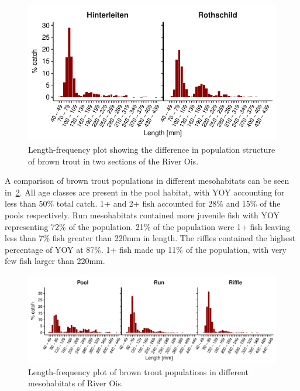 \begin{figure}[!htb]                              %
	\center
	\includegraphics{images/brown_section.pdf}                %
	\caption{Length-frequency plot showing the difference in population structure of brown trout in two sections of the River Ois.}   %
	\label{fig:brown_section}                                                       %
\end{figure}

A comparison of brown trout populations in different mesohabitats can be seen in~\cref{fig:brown_meso}.
All age classes are present in the pool habitat, with YOY accounting for less than 50\% total catch.
1+ and 2+ fish accounted for 28\% and 15\% of the pools respectively.
Run mesohabitats contained more juvenile fish with YOY representing 72\% of the population.
21\% of the population were 1+ fish leaving less than 7\% fish greater than 220mm in length.
The riffles contained the highest percentage of YOY at 87\%.
1+ fish made up 11\% of the population, with very few fish larger than 220mm.

\begin{figure}[!htb]                              %
	\center
	\includegraphics[width=\textwidth]{images/brown_meso}                %
	\caption{Length-frequency plot of brown trout populations in different mesohabitats of River Ois.}        %
	\label{fig:brown_meso}                                                       %
\end{figure}

